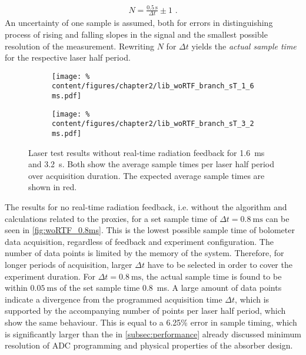 %
            \begin{align}%
                N=\frac{\SI{0.5}{\second}}{\Delta t}\pm1\,\,.\nonumber%
            \end{align}%
%
            An uncertainty of one sample is assumed, both for errors in distinguishing process of rising and falling slopes in the signal and the smallest possible resolution of the measurement. Rewriting $N$ for $\Delta t$ yields the \textit{actual sample time} for the respective laser half period.\\%
%
            \begin{figure}[t]%
                \centering%
                \begin{subfigure}{0.48\textwidth}%
                    \texttt{[image: \%
                        content/figures/chapter2/lib\_woRTF\_branch\_sT\_1\_6ms.pdf]}%
                \end{subfigure}%
                \hspace*{0.25cm}%
                \begin{subfigure}{0.48\textwidth}%
                    \texttt{[image: \%
                        content/figures/chapter2/lib\_woRTF\_branch\_sT\_3\_2ms.pdf]}%
                \end{subfigure}%
                \caption{Laser test results without real-time radiation feedback for \SI{1.6}{\milli\second} and \SI{3.2}{\second}. Both show the average sample times per laser half period over acquisition duration. The expected average sample times are shown in red.}\label{fig:woRTF_1.6_3.2ms}%
            \end{figure}%
%
            The results for no real-time radiation feedback, i.e. without the algorithm and calculations related to the proxies, for a set sample time of $\Delta t=\SI{0.8}{\milli\second}$ can be seen in \cref{fig:woRTF_0.8ms}. This is the lowest possible sample time of bolometer data acquisition, regardless of feedback and experiment configuration. The number of data points is limited by the memory of the system. Therefore, for longer periods of acquisition, larger $\Delta t$ have to be selected in order to cover the experiment duration. For $\Delta t=\SI{0.8}{\milli\second}$, the actual sample time is found to be within $\SI{0.05}{\milli\second}$ of the set sample time \SI{0.8}{\milli\second}. A large amount of data points indicate a divergence from the programmed acquisition time $\Delta t$, which is supported by the accompanying number of points per laser half period, which show the same behaviour. This is equal to a 6.25\% error in sample timing, which is significantly larger than the in \cref{subsec:performance} already discussed minimum resolution of ADC programming and physical properties of the absorber design.\\%
